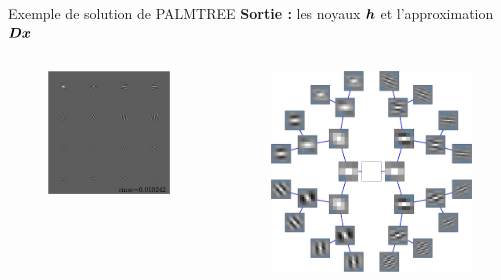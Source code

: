 \begin{frame}{Exemple de solution de PALMTREE}
\textbf{Sortie :} les noyaux $\bm{h}$ et l'approximation $\bm{D}\bm{x}$
\begin{columns}
\begin{column}{0.49\textwidth} \begin{figure}\centering
	\includegraphics[width=\textwidth]{figures/tree-learn-setup/xp_learnsupp256_curvelet_decomp3[tree-binary_dpth4]_supp-generic3x3_[fixed-supports]_approx.pdf}
\end{figure}\end{column}
\begin{column}{0.49\textwidth} \begin{figure}\centering
	\includegraphics[width=\textwidth]{figures/tree-learn-setup/xp_learnsupp256_curvelet_decomp3[tree-binary_dpth4]_supp-generic3x3_[fixed-supports]_mothertree.pdf}

\end{figure}
\end{column}
\end{columns}
\end{frame}

